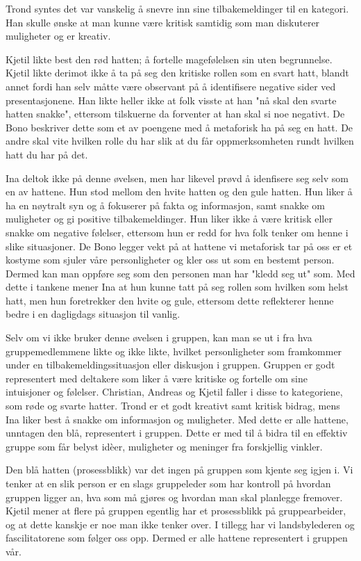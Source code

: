 Trond syntes det var vanskelig å snevre inn sine tilbakemeldinger til en kategori. Han skulle ønske at man kunne være kritisk samtidig som man diskuterer muligheter og er kreativ. 

Kjetil likte best den rød hatten; å fortelle magefølelsen sin uten begrunnelse. Kjetil likte derimot ikke å ta på seg den kritiske rollen som en svart hatt, blandt annet fordi han selv måtte være observant på å identifisere negative sider ved presentasjonene. Han likte heller ikke at folk visste at han "nå skal den svarte hatten snakke", ettersom tilskuerne da forventer at han skal si noe negativt. De Bono beskriver dette som et av poengene med å metaforisk ha på seg en hatt. De andre skal vite hvilken rolle du har slik at du får oppmerksomheten rundt hvilken hatt du har på det. 

Ina deltok ikke på denne øvelsen, men har likevel prøvd å idenfisere seg selv som en av hattene. Hun stod mellom den hvite hatten og den gule hatten. Hun liker å ha en nøytralt syn og å fokuserer på fakta og informasjon, samt snakke om muligheter og gi positive tilbakemeldinger. Hun liker ikke å være kritisk eller snakke om negative følelser, ettersom hun er redd for hva folk tenker om henne i slike situasjoner. De Bono legger vekt på at hattene vi metaforisk tar på oss er et kostyme som sjuler våre personligheter og kler oss ut som en bestemt person. Dermed kan man oppføre seg som den personen man har "kledd seg ut" som. Med dette i tankene mener Ina at hun kunne tatt på seg rollen som hvilken som helst hatt, men hun foretrekker den hvite og gule, ettersom dette reflekterer henne bedre i en dagligdags situasjon til vanlig.

Selv om vi ikke bruker denne øvelsen i gruppen, kan man se ut i fra hva gruppemedlemmene likte og ikke likte, hvilket personligheter som framkommer under en tilbakemeldingssituasjon eller diskusjon i gruppen. Gruppen er godt representert med deltakere som liker å være kritiske og fortelle om sine intuisjoner og følelser. Christian, Andreas og Kjetil faller i disse to kategoriene, som røde og svarte hatter. Trond er et godt kreativt samt kritisk bidrag, mens Ina liker best å snakke om informasjon og muligheter. Med dette er alle hattene, unntagen den blå, representert i gruppen. Dette er med til å bidra til en effektiv gruppe som får belyst idèer, muligheter og meninger fra forskjellig vinkler. 

Den blå hatten (prosessblikk) var det ingen på gruppen som kjente seg igjen i. Vi tenker at en slik person er en slags gruppeleder som har kontroll på hvordan gruppen ligger an, hva som må gjøres og hvordan man skal planlegge fremover. Kjetil mener at flere på gruppen egentlig har et prosessblikk på gruppearbeider, og at dette kanskje er noe man ikke tenker over. I tillegg har vi landsbylederen og fascilitatorene som følger oss opp. Dermed er alle hattene representert i gruppen vår.


